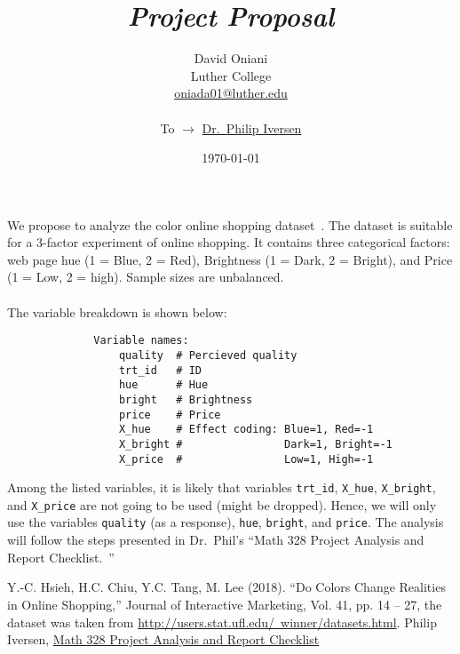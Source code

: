 \documentclass[11pt]{article}
\author{David Oniani\\
        Luther College\\
        \href{mailto:oniada01@luther.edu}{oniada01@luther.edu}\\\\
        To \(\to\) \href{mailto:iverph01@luther.edu}{Dr.~Philip Iversen}}
\title{\color{orange}\textit{Project Proposal}}
\date{\today}
\begin{document}
\maketitle


\subsection*{\centering\color{orange}{Color Effects on Perceived Quality of
Online Shopping Web Page}}

We propose to analyze the color online shopping dataset~\cite{1}. The dataset
is suitable for a 3-factor experiment of online shopping. It contains three
categorical factors: web page hue (1 = Blue, 2 = Red), Brightness (1 = Dark, 2
= Bright), and Price (1 = Low, 2 = high). Sample sizes are unbalanced.
\\\\
The variable breakdown is shown below:

\begin{figure}[H]
    \centering
    \begin{verbatim}
        Variable names:
            quality  # Percieved quality
            trt_id   # ID
            hue      # Hue
            bright   # Brightness
            price    # Price
            X_hue    # Effect coding: Blue=1, Red=-1
            X_bright #                Dark=1, Bright=-1
            X_price  #                Low=1, High=-1
    \end{verbatim}
\end{figure}

Among the listed variables, it is likely that variables \texttt{trt_id},
\texttt{X_hue}, \texttt{X_bright}, and \texttt{X_price}
are not going to be used (might be dropped). Hence, we will only use the
variables \texttt{quality} (as a response), \texttt{hue},
\texttt{bright}, and \texttt{price}. The analysis will follow the
steps presented in Dr.~Phil's ``Math 328 Project Analysis and Report
Checklist.~\cite{2}''


\begin{thebibliography}{00}
     Y.-C. Hsieh, H.C. Chiu, Y.C. Tang, M. Lee (2018). ``Do Colors
        Change Realities in Online Shopping,'' Journal of Interactive
        Marketing, Vol. 41, pp. 14 -- 27, the dataset was taken from
        \href{http://users.stat.ufl.edu/~winner/datasets.html}{http://users.stat.ufl.edu/~winner/datasets.html}.
        Philip Iversen,
        \href{https://katie.luther.edu/pluginfile.php/623063/mod_folder/content/0/Math\%20328\%20Project\%20Analysis\%20and\%20Report\%20Checklist.pdf?forcedownload=1}{Math
        328 Project Analysis and Report Checklist}
\end{thebibliography}

\end{document}
